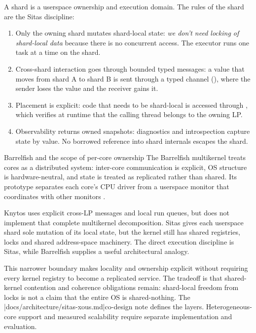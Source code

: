 A shard is a userspace ownership and execution domain. The rules of the shard are
the Sitas discipline:

\begin{enumerate}
    \item Only the owning shard mutates shard-local state: \emph{we don't need locking
        of shard-local data} because there is no concurrent access. The
        executor runs one task at a time on the shard.

    \item Cross-shard interaction goes through bounded typed messages:
        a value that moves from shard A to shard B is sent through a typed
        channel (), where the sender loses the value
        and the receiver gains it.

    \item Placement is explicit: code that needs to be shard-local is
        accessed through , which verifies at runtime that
        the calling thread belongs to the owning LP.

    \item Observability returns owned snapshots: diagnostics and
        introspection capture state by value. No borrowed reference into shard
        internals escapes the shard.
\end{enumerate}

\begin{architecturalcomparison}{Barrelfish and the scope of per-core ownership}
The Barrelfish multikernel treats cores as a distributed system: inter-core
communication is explicit, OS structure is hardware-neutral, and state is
treated as replicated rather than shared. Its prototype separates each core's
CPU driver from a userspace monitor that coordinates with other monitors
\cite{prior:barrelfish}.

Knytos uses explicit cross-LP messages and local run queues, but does not
implement that complete multikernel decomposition. Sitas gives each userspace
shard sole mutation of its local state, but the kernel still has shared registries,
locks and shared address-space machinery. The direct execution discipline is
Sitas, while Barrelfish supplies a useful architectural analogy.

This narrower boundary makes locality and ownership explicit without requiring
every kernel registry to become a replicated service. The tradeoff is that
shared-kernel contention and coherence obligations remain: shard-local freedom
from locks is not a claim that the entire OS is shared-nothing. The
\repofiletext|docs/architecture/sitas-xous.md|{co-design note} defines the
layers. Heterogeneous-core support and measured scalability require separate
implementation and evaluation.
\end{architecturalcomparison}

